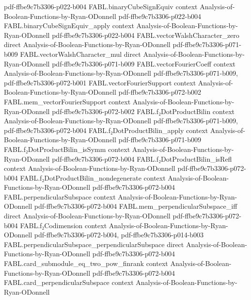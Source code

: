 \begin{theorem}
  {pdf-ffbe9c7b3306-p022-b004}
\proofstep
  {FABL.binaryCubeSignEquiv}
  {context}
  {Analysis-of-Boolean-Functions-by-Ryan-ODonnell}
  {pdf-ffbe9c7b3306-p022-b004}
\proofstep
  {FABL.binaryCubeSignEquiv_apply}
  {context}
  {Analysis-of-Boolean-Functions-by-Ryan-ODonnell}
  {pdf-ffbe9c7b3306-p022-b004}
\proofstep
  {FABL.vectorWalshCharacter_zero}
  {direct}
  {Analysis-of-Boolean-Functions-by-Ryan-ODonnell}
  {pdf-ffbe9c7b3306-p071-b009}
\proofstep
  {FABL.vectorWalshCharacter_mul}
  {direct}
  {Analysis-of-Boolean-Functions-by-Ryan-ODonnell}
  {pdf-ffbe9c7b3306-p071-b009}
\proofstep
  {FABL.vectorFourierCoeff}
  {context}
  {Analysis-of-Boolean-Functions-by-Ryan-ODonnell}
  {pdf-ffbe9c7b3306-p071-b009,
    pdf-ffbe9c7b3306-p072-b001}
\proofstep
  {FABL.vectorFourierSupport}
  {context}
  {Analysis-of-Boolean-Functions-by-Ryan-ODonnell}
  {pdf-ffbe9c7b3306-p072-b002}
\proofstep
  {FABL.mem_vectorFourierSupport}
  {context}
  {Analysis-of-Boolean-Functions-by-Ryan-ODonnell}
  {pdf-ffbe9c7b3306-p072-b002}
\proofstep
  {FABL.f₂DotProductBilin}
  {context}
  {Analysis-of-Boolean-Functions-by-Ryan-ODonnell}
  {pdf-ffbe9c7b3306-p071-b009,
    pdf-ffbe9c7b3306-p072-b004}
\proofstep
  {FABL.f₂DotProductBilin_apply}
  {context}
  {Analysis-of-Boolean-Functions-by-Ryan-ODonnell}
  {pdf-ffbe9c7b3306-p071-b009}
\proofstep
  {FABL.f₂DotProductBilin_isSymm}
  {context}
  {Analysis-of-Boolean-Functions-by-Ryan-ODonnell}
  {pdf-ffbe9c7b3306-p072-b004}
\proofstep
  {FABL.f₂DotProductBilin_isRefl}
  {context}
  {Analysis-of-Boolean-Functions-by-Ryan-ODonnell}
  {pdf-ffbe9c7b3306-p072-b004}
\proofstep
  {FABL.f₂DotProductBilin_nondegenerate}
  {context}
  {Analysis-of-Boolean-Functions-by-Ryan-ODonnell}
  {pdf-ffbe9c7b3306-p072-b004}
\proofstep
  {FABL.perpendicularSubspace}
  {context}
  {Analysis-of-Boolean-Functions-by-Ryan-ODonnell}
  {pdf-ffbe9c7b3306-p072-b004}
\proofstep
  {FABL.mem_perpendicularSubspace_iff}
  {direct}
  {Analysis-of-Boolean-Functions-by-Ryan-ODonnell}
  {pdf-ffbe9c7b3306-p072-b004}
\proofstep
  {FABL.f₂Codimension}
  {context}
  {Analysis-of-Boolean-Functions-by-Ryan-ODonnell}
  {pdf-ffbe9c7b3306-p072-b004,
    pdf-ffbe9c7b3306-p014-b003}
\proofstep
  {FABL.perpendicularSubspace_perpendicularSubspace}
  {direct}
  {Analysis-of-Boolean-Functions-by-Ryan-ODonnell}
  {pdf-ffbe9c7b3306-p072-b004}
\proofstep
  {FABL.card_submodule_eq_two_pow_finrank}
  {context}
  {Analysis-of-Boolean-Functions-by-Ryan-ODonnell}
  {pdf-ffbe9c7b3306-p072-b004}
\proofstep
  {FABL.card_perpendicularSubspace}
  {context}
  {Analysis-of-Boolean-Functions-by-Ryan-ODonnell}

\end{theorem}
